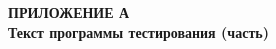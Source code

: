 \begin{center}
\textbf{
\MakeUppercase{Приложение А}\\
    Текст программы тестирования (часть)}
\end{center}
\label{appendix}


